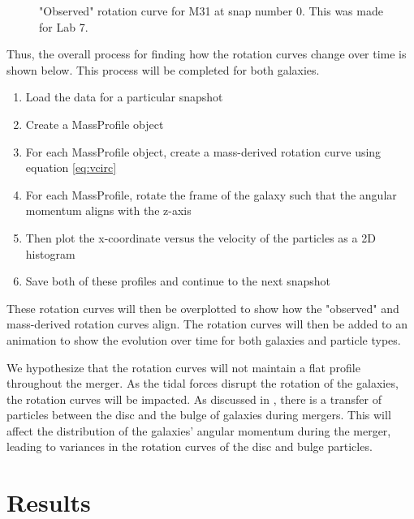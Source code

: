 \documentclass[twocolumn,linenumbers,trackchanges]{aastex7}
\begin{document}
\begin{figure}[ht!]
	\caption{"Observed" rotation curve for M31 at snap number 0. This was made for Lab 7.}
	\label{fig:Lab7}
\end{figure}

Thus, the overall process for finding how the rotation curves change over time is shown below.
This process will be completed for both galaxies.
\begin{enumerate}
	\item Load the data for a particular snapshot
	\item Create a MassProfile object
	\item For each MassProfile object, create a mass-derived rotation curve using equation \ref{eq:vcirc}
	\item For each MassProfile, rotate the frame of the galaxy such that the angular momentum aligns with the z-axis
	\item Then plot the x-coordinate versus the velocity of the particles as a 2D histogram
	\item Save both of these profiles and continue to the next snapshot
\end{enumerate}


These rotation curves will then be overplotted to show how the "observed" and mass-derived rotation curves align.
The rotation curves will then be added to an animation to show the evolution over time for both galaxies and particle types.

We hypothesize that the rotation curves will not maintain a flat profile throughout the merger.
As the tidal forces disrupt the rotation of the galaxies, the rotation curves will be impacted.
As discussed in \cite{Kannan2015}, there is a transfer of particles between the disc and the bulge of galaxies during mergers.
This will affect the distribution of the galaxies' angular momentum during the merger, leading to variances in the rotation curves of the disc and bulge particles.

\section{Results}
\end{document}
